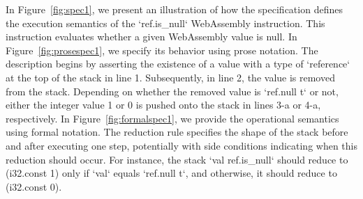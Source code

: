 In Figure~\ref{fig:spec1}, we present an illustration of how the specification
defines the execution semantics of the `ref.is\_null` WebAssembly instruction.
This instruction evaluates whether a given WebAssembly value is null. In
Figure~\ref{fig:prosespec1}, we specify its behavior using prose notation. The
description begins by asserting the existence of a value with a type of
`reference` at the top of the stack in line 1. Subsequently, in line 2, the
value is removed from the stack.  Depending on whether the removed value is
`ref.null t` or not, either the integer value 1 or 0 is pushed onto the stack
in lines 3-a or 4-a, respectively. In Figure~\ref{fig:formalspec1}, we provide
the operational semantics using formal notation. The reduction rule specifies
the shape of the stack before and after executing one step, potentially with
side conditions indicating when this reduction should occur. For instance, the
stack `val ref.is\_null` should reduce to (i32.const 1) only if `val` equals
`ref.null t`, and otherwise, it should reduce to (i32.const 0).


